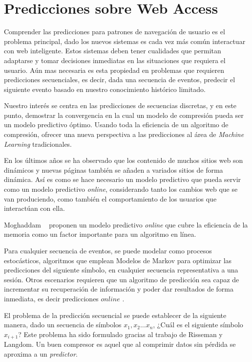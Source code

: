 \chapter[Predicciones sobre Web Access]{Predicciones sobre Web Access} 
\label{ch:predicciones-webaccess}





Comprender las predicciones para patrones de navegación de usuario es el problema principal, dado los nuevos sistemas es cada vez más común interactuar con web inteligente. Estos sistemas deben tener cualidades que permitan adaptarse y tomar decisiones inmediatas en las situaciones que requiera el usuario. Aún mas necesaria es esta propiedad en problemas que requieren predicciones secuenciales, es decir, dada una secuencia de eventos,  predecir el siguiente evento basado en nuestro conocimiento histórico limitado.

Nuestro interés se centra en las predicciones de secuencias discretas, y en este punto, demostrar la convergencia en la cual un modelo de compresión pueda ser un modelo predictivo óptimo. Usando 
toda la eficiencia de un algoritmo de compresión, ofrecer una nueva perspectiva a las predicciones al área de \emph{Machine Learning} tradicionales. 

En los últimos años se ha observado que  los contenido de muchos sitios web son dinámicos y nuevas páginas también se añaden a variados sitios de forma dinámica. Así es como  se hace necesario un modelo predictivo que pueda servir como un modelo predictivo \emph{online},  considerando tanto los cambios web que se van produciendo, como también el comportamiento de los usuarios que interactúan con ella. 

Moghaddam \etal~\cite{Moghaddam2009} proponen un modelo predictivo \emph{online} que cubre la eficiencia de la memoria como un factor importante para un algoritmo en línea. 

Para cualquier secuencia de eventos, se puede modelar como procesos estocásticos, algoritmos que emplean Modelos de Markov para optimizar las predicciones del siguiente símbolo, en cualquier secuencia representativa a una sesión. Otros escenarios requieren que un algoritmo de predicción sea capaz de incrementar su recuperación de información  y poder dar resultados de forma inmediata, es decir predicciones $online$ .

El problema de la predicción secuencial se puede establecer de la siguiente manera, dado un secuencia de símbolos $x_{1}, x_{2}\dots x_{n}$, ¿Cuál es el siguiente símbolo $x_{i+1}$? Este problema ha sido formulado gracias al trabajo de  Risseman\cite{Rissanen1983} y Langdom\cite{Langdon1983}. Un buen compresor es aquel que al comprimir datos sin pérdida se aproxima a un \emph{predictor}.

